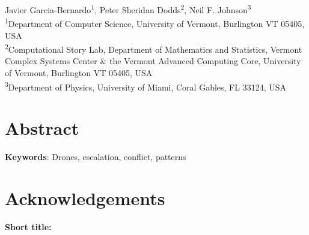 \documentclass[12pt]{article}
\begin{document}
\begin{flushleft}
{\huge
\textbf{}
}\smallbreak

Javier Garcia-Bernardo\textsuperscript{1}, 
Peter Sheridan Dodds\textsuperscript{2}, 
Neil F. Johnson\textsuperscript{3}
\\
\textsuperscript{1}Department of Computer Science, University of Vermont, Burlington VT 05405, USA \\
\textsuperscript{2}Computational Story Lab, Department of Mathematics and Statistics, Vermont Complex Systems Center \& the Vermont Advanced Computing Core, University of Vermont, Burlington VT 05405, USA \\
\textsuperscript{3}Department of Physics, University of Miami, Coral Gables, FL 33124, USA
\end{flushleft}

\section*{Abstract}


\noindent \textbf{Keywords}: Drones, escalation, conflict, patterns





\section*{Acknowledgements}


\bigskip
\bigskip

\noindent
\textbf{Short title:} 
\end{document}
